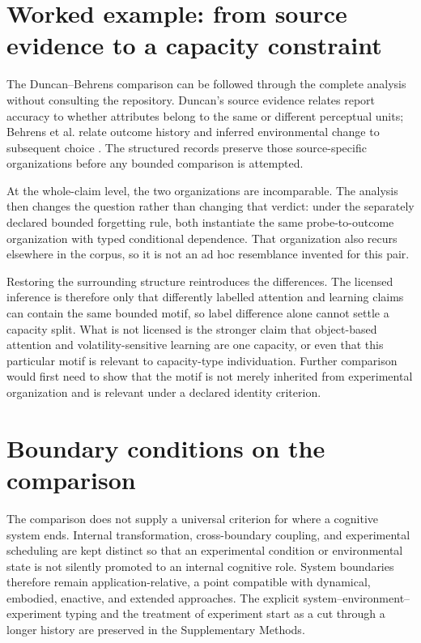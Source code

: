 \documentclass[11pt]{article}
\begin{document}
\section{Worked example: from source evidence to a capacity constraint}

The Duncan--Behrens comparison can be followed through the complete analysis without consulting the repository. Duncan's source evidence relates report accuracy to whether attributes belong to the same or different perceptual units; Behrens et al. relate outcome history and inferred environmental change to subsequent choice \citep{Duncan1984SelectiveAttention,BehrensEtAl2007ValueInformation}. The structured records preserve those source-specific organizations before any bounded comparison is attempted.

At the whole-claim level, the two organizations are incomparable. The analysis then changes the question rather than changing that verdict: under the separately declared bounded forgetting rule, both instantiate the same probe-to-outcome organization with typed conditional dependence. That organization also recurs elsewhere in the corpus, so it is not an ad hoc resemblance invented for this pair.

Restoring the surrounding structure reintroduces the differences. The licensed inference is therefore only that differently labelled attention and learning claims can contain the same bounded motif, so label difference alone cannot settle a capacity split. What is not licensed is the stronger claim that object-based attention and volatility-sensitive learning are one capacity, or even that this particular motif is relevant to capacity-type individuation. Further comparison would first need to show that the motif is not merely inherited from experimental organization and is relevant under a declared identity criterion.

\section{Boundary conditions on the comparison}

The comparison does not supply a universal criterion for where a cognitive system ends. Internal transformation, cross-boundary coupling, and experimental scheduling are kept distinct so that an experimental condition or environmental state is not silently promoted to an internal cognitive role. System boundaries therefore remain application-relative, a point compatible with dynamical, embodied, enactive, and extended approaches. The explicit system--environment--experiment typing and the treatment of experiment start as a cut through a longer history are preserved in the Supplementary Methods.
\end{document}
